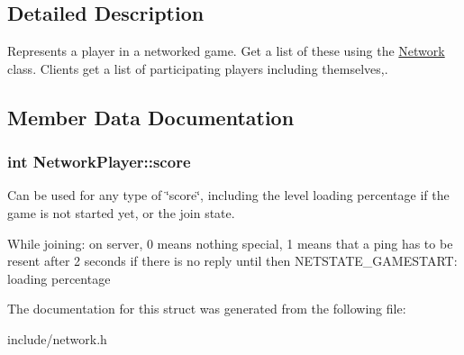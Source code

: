 \subsection{\-Detailed \-Description}
\-Represents a player in a networked game. \-Get a list of these using the \hyperlink{classNetwork}{\-Network} class. \-Clients get a list of participating players including themselves,. 

\subsection{\-Member \-Data \-Documentation}
\hypertarget{structNetworkPlayer_af452133f33571ac0d7904a1bf392fc29}{
\subsubsection[{score}]{\setlength{\rightskip}{0pt plus 5cm}int {\bf \-Network\-Player\-::score}}}
\label{d4/dd8/structNetworkPlayer_af452133f33571ac0d7904a1bf392fc29}


\-Can be used for any type of \char`\"{}score\char`\"{}, including the level loading percentage if the game is not started yet, or the join state. 

\-While joining\-: on server, 0 means nothing special, 1 means that a ping has to be resent after 2 seconds if there is no reply until then \-N\-E\-T\-S\-T\-A\-T\-E\-\_\-\-G\-A\-M\-E\-S\-T\-A\-R\-T\-: loading percentage 

\-The documentation for this struct was generated from the following file\-:\begin{DoxyCompactItemize}
\item 
include/network.\-h\end{DoxyCompactItemize}
